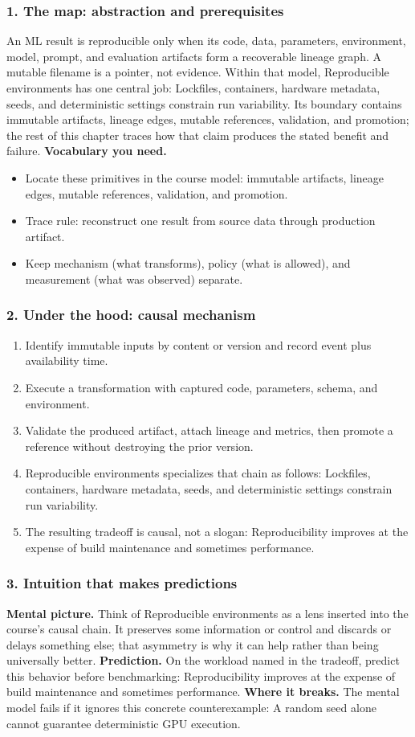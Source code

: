 \subsubsection*{1. The map: abstraction and prerequisites}
An ML result is reproducible only when its code, data, parameters, environment, model, prompt, and evaluation artifacts form a recoverable lineage graph. A mutable filename is a pointer, not evidence.
Within that model, Reproducible environments has one central job: Lockfiles, containers, hardware metadata, seeds, and deterministic settings constrain run variability. Its boundary contains immutable artifacts, lineage edges, mutable references, validation, and promotion; the rest of this chapter traces how that claim produces the stated benefit and failure.
\textbf{Vocabulary you need.}\begin{itemize}
\item Locate these primitives in the course model: immutable artifacts, lineage edges, mutable references, validation, and promotion.
\item Trace rule: reconstruct one result from source data through production artifact.
\item Keep mechanism (what transforms), policy (what is allowed), and measurement (what was observed) separate.
\end{itemize}
\subsubsection*{2. Under the hood: causal mechanism}\begin{enumerate}
\item Identify immutable inputs by content or version and record event plus availability time.
\item Execute a transformation with captured code, parameters, schema, and environment.
\item Validate the produced artifact, attach lineage and metrics, then promote a reference without destroying the prior version.
\item Reproducible environments specializes that chain as follows: Lockfiles, containers, hardware metadata, seeds, and deterministic settings constrain run variability.
\item The resulting tradeoff is causal, not a slogan: Reproducibility improves at the expense of build maintenance and sometimes performance.
\end{enumerate}
\subsubsection*{3. Intuition that makes predictions}
\textbf{Mental picture.} Think of Reproducible environments as a lens inserted into the course's causal chain. It preserves some information or control and discards or delays something else; that asymmetry is why it can help rather than being universally better.
\textbf{Prediction.} On the workload named in the tradeoff, predict this behavior before benchmarking: Reproducibility improves at the expense of build maintenance and sometimes performance.
\textbf{Where it breaks.} The mental model fails if it ignores this concrete counterexample: A random seed alone cannot guarantee deterministic GPU execution.
